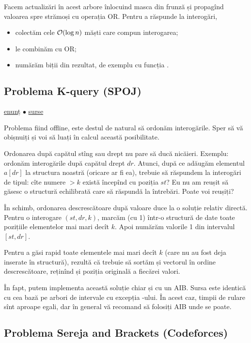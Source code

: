 \documentclass[../main.tex]{subfiles}
\begin{document}
Facem actualizări în acest arbore înlocuind masca din frunză și propagînd valoarea spre strămoși cu operația OR. Pentru a răspunde la interogări,

\begin{itemize}
  \item colectăm cele $\mathcal{O}(\log n)$ măști care compun interogarea;
  \item le combinăm cu OR;
  \item numărăm biții din rezultat, de exemplu cu funcția .
\end{itemize}

\subsection{Problema K-query (SPOJ)}
\label{problem:k-query}

\href{https://www.spoj.com/problems/KQUERY/}{enunț}
$\bullet$
\hyperref[code:k-query]{surse}

Problema fiind offline, este destul de natural să ordonăm interogările. Sper să vă obișnuiți și voi să luați în calcul această posibilitate.

Ordonarea după capătul stîng sau drept nu pare să ducă nicăieri. Exemplu: ordonăm interogările după capătul drept $dr$. Atunci, după ce adăugăm elementul $a[dr]$ la structura noastră (oricare ar fi ea), trebuie să răspundem la interogări de tipul: cîte numere $> k$ există începînd cu poziția $st$? Eu nu am reușit să găsesc o structură echilibrată care să răspundă la întrebări. Poate voi reușiți?

În schimb, ordonarea descrescătoare după valoare duce la o soluție relativ directă. Pentru o interogare $(st, dr, k)$, marcăm (cu 1) într-o structură de date toate pozițiile elementelor mai mari decît $k$. Apoi numărăm valorile 1 din intervalul $[st, dr]$.

Pentru a găsi rapid toate elementele mai mari decît $k$ (care nu au fost deja inserate în structură), rezultă că trebuie să sortăm și vectorul în ordine descrescătoare, reținînd și poziția originală a fiecărei valori.

În fapt, putem implementa această soluție chiar și cu un AIB. Sursa este identică cu cea bază pe arbori de intervale cu excepția -ului. În acest caz, timpii de rulare sînt aproape egali, dar în general vă recomand să folosiți AIB unde se poate.

\subsection{Problema Sereja and Brackets (Codeforces)}
\label{problem:sereja-and-brackets}
\end{document}
